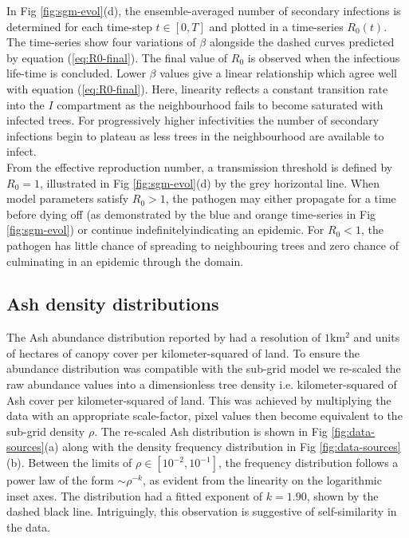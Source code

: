 In Fig \ref{fig:sgm-evol}(d), the ensemble-averaged number of secondary infections is determined for each time-step $t\in [0, T]$ and plotted in a time-series $R_0(t)$. The time-series show four variations of $\beta$ alongside the dashed curves predicted by equation (\ref{eq:R0-final}). The final value of $R_0$ is observed when the infectious life-time is concluded. Lower $\beta$ values give a linear relationship which agree well with equation (\ref{eq:R0-final}). Here, linearity reflects a constant transition rate into the $I$ compartment as the neighbourhood fails to become saturated with infected trees. For progressively higher infectivities the number of secondary infections begin to plateau as less trees in the neighbourhood are available to infect.\\

From the effective reproduction number, a transmission threshold is defined by $R_0=1$, illustrated in Fig \ref{fig:sgm-evol}(d) by the grey horizontal line. When model parameters satisfy $R_0>1$, the pathogen may either propagate for a time before dying off (as demonstrated by the blue and orange time-series in Fig \ref{fig:sgm-evol}) or continue indefinitely\textemdash indicating an epidemic. For $R_0<1$, the pathogen has little chance of spreading to neighbouring trees and zero chance of culminating in an epidemic through the domain\protect\footnotemark {}.\\

\subsection{Ash density distributions}
\label{section:data-rescale}

The Ash abundance distribution reported by \cite{hill.data} had a resolution of $\mathrm{1km^2}$ and units of hectares of canopy cover per kilometer-squared of land. To ensure the abundance distribution was compatible with the sub-grid model we re-scaled the raw abundance values into a dimensionless tree density i.e. kilometer-squared of Ash cover per kilometer-squared of land. This was achieved by multiplying the data with an appropriate scale-factor, pixel values then become equivalent to the sub-grid density $\rho$. The re-scaled Ash distribution is shown in Fig \ref{fig:data-sources}(a) along with the density frequency distribution in Fig \ref{fig:data-sources}(b). Between the limits of $\rho \in [10^{-2}, 10^{-1}]$, the frequency distribution follows a power law of the form $\sim \rho ^{-k}$, as evident from the linearity on the logarithmic inset axes. The distribution had a fitted exponent of $k=1.90$, shown by the dashed black line. Intriguingly, this observation is suggestive of self-similarity in the data.

